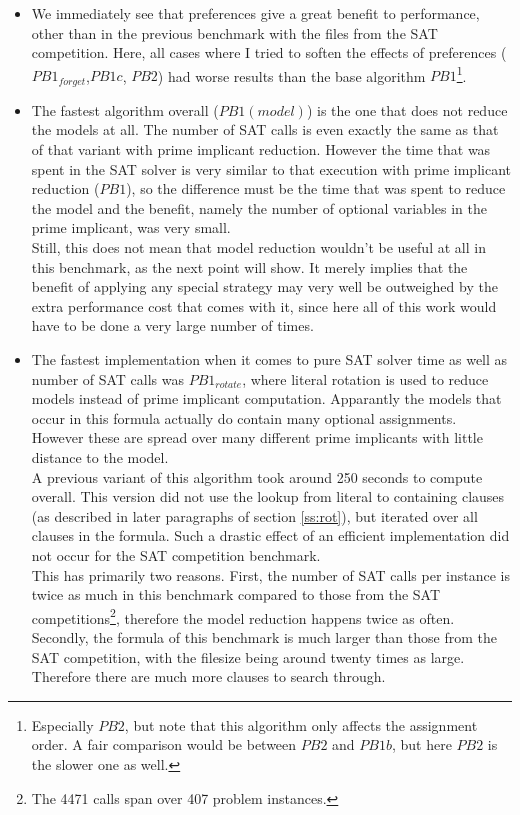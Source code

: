 \begin{itemize}
\item We immediately see that preferences give a great benefit to performance, other than in the previous benchmark with the files from the SAT competition. Here, all cases where I tried to soften the effects of preferences ($PB1_{forget}$,$PB1c$, $PB2$) had worse results than the base algorithm $PB1$\footnote{
	Especially $PB2$, but note that this algorithm only affects the assignment order. A fair comparison would be between $PB2$ and $PB1b$, but here $PB2$ is the slower one as well.
}. 
\item The fastest algorithm overall ($PB1(model)$) is the one that does not reduce the models at all. The number of SAT calls is even exactly the same as that of that variant with prime implicant reduction. However the time that was spent in the SAT solver is very similar to that execution with prime implicant reduction ($PB1$), so the difference must be the time that was spent to reduce the model and the benefit, namely the number of optional variables in the prime implicant, was very small.\\
Still, this does not mean that model reduction wouldn't be useful at all in this benchmark, as the next point will show. It merely implies that the benefit of applying any special strategy may very well be outweighed by the extra performance cost that comes with it, since here all of this work would have to be done a very large number of times.
\item The fastest implementation when it comes to pure SAT solver time as well as number of SAT calls was $PB1_{rotate}$, where literal rotation is used to reduce models instead of prime implicant computation. Apparantly the models that occur in this formula actually do contain many optional assignments. However these are spread over many different prime implicants with little distance to the model.\\
A previous variant of this algorithm took around 250 seconds to compute overall. This version did not use the lookup from literal to containing clauses (as described in later paragraphs of section \ref{ss:rot}), but iterated over all clauses in the formula. Such a drastic effect of an efficient implementation did not occur for the SAT competition benchmark.\\
This has primarily two reasons. First, the number of SAT calls per instance is twice as much in this benchmark compared to those from the SAT competitions\footnote{The 4471 calls span over 407 problem instances.}, therefore the model reduction happens twice as often. Secondly, the formula of this benchmark is much larger than those from the SAT competition, with the filesize being around twenty times as large. Therefore there are much more clauses to search through.

\end{itemize}

